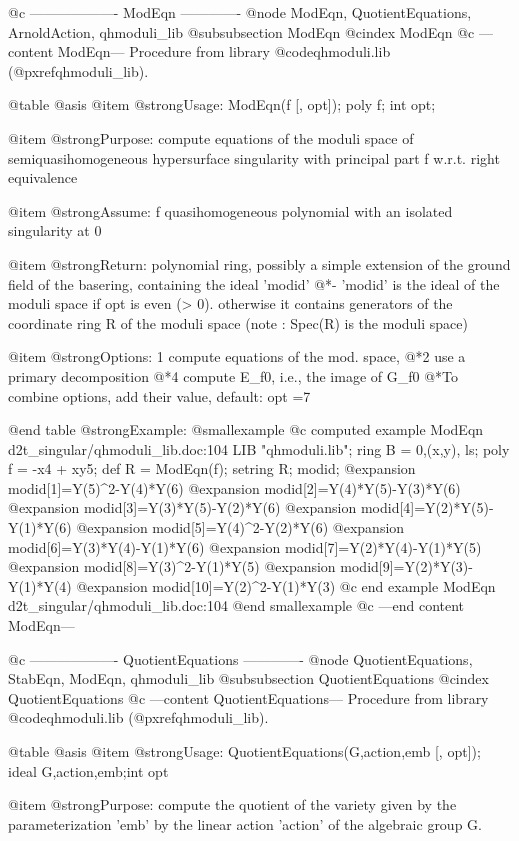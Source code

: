 @c ------------------- ModEqn -------------
@node ModEqn, QuotientEquations, ArnoldAction, qhmoduli_lib
@subsubsection ModEqn
@cindex ModEqn
@c ---content ModEqn---
Procedure from library @code{qhmoduli.lib} (@pxref{qhmoduli_lib}).

@table @asis
@item @strong{Usage:}
ModEqn(f [, opt]); poly f; int opt;

@item @strong{Purpose:}
compute equations of the moduli space of semiquasihomogeneous hypersurface singularity with principal part f w.r.t. right equivalence

@item @strong{Assume:}
f quasihomogeneous polynomial with an isolated singularity at 0

@item @strong{Return:}
polynomial ring, possibly a simple extension of the ground field of
the basering, containing the ideal 'modid'
@*- 'modid' is the ideal of the moduli space if opt is even (> 0).
otherwise it contains generators of the coordinate ring R of the
moduli space (note : Spec(R) is the moduli space)

@item @strong{Options:}
1 compute equations of the mod. space,
@*2 use a primary decomposition
@*4 compute E_f0, i.e., the image of G_f0
@*To combine options, add their value, default: opt =7

@end table
@strong{Example:}
@smallexample
@c computed example ModEqn d2t_singular/qhmoduli_lib.doc:104 
LIB "qhmoduli.lib";
ring B   = 0,(x,y), ls;
poly f = -x4 + xy5;
def R = ModEqn(f);
setring R;
modid;
@expansion{} modid[1]=Y(5)^2-Y(4)*Y(6)
@expansion{} modid[2]=Y(4)*Y(5)-Y(3)*Y(6)
@expansion{} modid[3]=Y(3)*Y(5)-Y(2)*Y(6)
@expansion{} modid[4]=Y(2)*Y(5)-Y(1)*Y(6)
@expansion{} modid[5]=Y(4)^2-Y(2)*Y(6)
@expansion{} modid[6]=Y(3)*Y(4)-Y(1)*Y(6)
@expansion{} modid[7]=Y(2)*Y(4)-Y(1)*Y(5)
@expansion{} modid[8]=Y(3)^2-Y(1)*Y(5)
@expansion{} modid[9]=Y(2)*Y(3)-Y(1)*Y(4)
@expansion{} modid[10]=Y(2)^2-Y(1)*Y(3)
@c end example ModEqn d2t_singular/qhmoduli_lib.doc:104
@end smallexample
@c ---end content ModEqn---

@c ------------------- QuotientEquations -------------
@node QuotientEquations, StabEqn, ModEqn, qhmoduli_lib
@subsubsection QuotientEquations
@cindex QuotientEquations
@c ---content QuotientEquations---
Procedure from library @code{qhmoduli.lib} (@pxref{qhmoduli_lib}).

@table @asis
@item @strong{Usage:}
QuotientEquations(G,action,emb [, opt]); ideal G,action,emb;int opt

@item @strong{Purpose:}
compute the quotient of the variety given by the parameterization
'emb' by the linear action 'action' of the algebraic group G.

